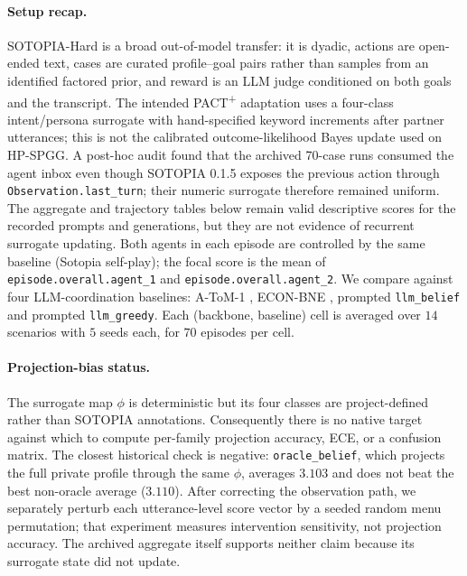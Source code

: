 \paragraph{Setup recap.} SOTOPIA-Hard \citep{zhou2024sotopia} is a broad out-of-model transfer: it is dyadic, actions are open-ended text, cases are curated profile--goal pairs rather than samples from an identified factored prior, and reward is an LLM judge conditioned on both goals and the transcript. The intended PACT\textsuperscript{+} adaptation uses a four-class intent/persona surrogate with hand-specified keyword increments after partner utterances; this is not the calibrated outcome-likelihood Bayes update used on HP-SPGG. A post-hoc audit found that the archived 70-case runs consumed the agent inbox even though SOTOPIA 0.1.5 exposes the previous action through \texttt{Observation.last\_turn}; their numeric surrogate therefore remained uniform. The aggregate and trajectory tables below remain valid descriptive scores for the recorded prompts and generations, but they are not evidence of recurrent surrogate updating. Both agents in each episode are controlled by the same baseline (Sotopia self-play); the focal score is the mean of \texttt{episode.overall.agent\_1} and \texttt{episode.overall.agent\_2}. We compare against four LLM-coordination baselines: A-ToM-1 \citep{xu2026atom}, ECON-BNE \citep{yang2025econ}, prompted \texttt{llm\_belief} and prompted \texttt{llm\_greedy}. Each (backbone, baseline) cell is averaged over $14$ scenarios with $5$ seeds each, for $70$ episodes per cell.

\paragraph{Projection-bias status.} The surrogate map $\phi$ is deterministic but its four classes are project-defined rather than SOTOPIA annotations. Consequently there is no native target against which to compute per-family projection accuracy, ECE, or a confusion matrix. The closest historical check is negative: \texttt{oracle\_belief}, which projects the full private profile through the same $\phi$, averages $3.103$ and does not beat the best non-oracle average ($3.110$). After correcting the observation path, we separately perturb each utterance-level score vector by a seeded random menu permutation; that experiment measures intervention sensitivity, not projection accuracy. The archived aggregate itself supports neither claim because its surrogate state did not update.

